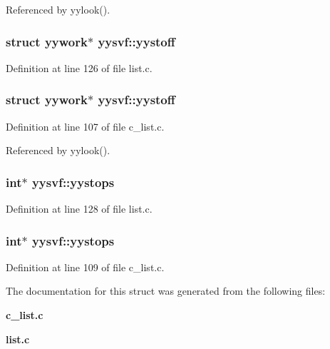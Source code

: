 Referenced by yylook().
\subsubsection{\setlength{\rightskip}{0pt plus 5cm}struct \bf{yywork}$\ast$ \bf{yysvf::yystoff}}\label{structyysvf_6ddd31507dab950aee4d5cd4bd9117e9}




Definition at line 126 of file list.c.
\subsubsection{\setlength{\rightskip}{0pt plus 5cm}struct \bf{yywork}$\ast$ \bf{yysvf::yystoff}}\label{structyysvf_6ddd31507dab950aee4d5cd4bd9117e9}




Definition at line 107 of file c\_\-list.c.

Referenced by yylook().
\subsubsection{\setlength{\rightskip}{0pt plus 5cm}int$\ast$ \bf{yysvf::yystops}}\label{structyysvf_7f15957e1a59ae4f648e57ce70f7a133}




Definition at line 128 of file list.c.
\subsubsection{\setlength{\rightskip}{0pt plus 5cm}int$\ast$ \bf{yysvf::yystops}}\label{structyysvf_7f15957e1a59ae4f648e57ce70f7a133}




Definition at line 109 of file c\_\-list.c.

The documentation for this struct was generated from the following files:\begin{CompactItemize}
\item 
\bf{c\_\-list.c}\item 
\bf{list.c}\end{CompactItemize}
